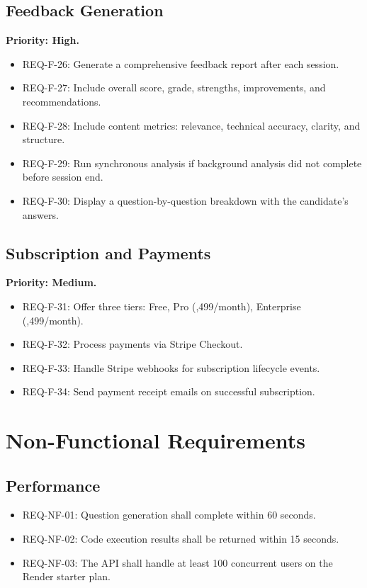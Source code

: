 \subsection{Feedback Generation}
\textbf{Priority: High.}
\begin{itemize}
  \item REQ-F-26: Generate a comprehensive feedback report after each session.
  \item REQ-F-27: Include overall score, grade, strengths, improvements, and recommendations.
  \item REQ-F-28: Include content metrics: relevance, technical accuracy, clarity, and structure.
  \item REQ-F-29: Run synchronous analysis if background analysis did not complete before session end.
  \item REQ-F-30: Display a question-by-question breakdown with the candidate's answers.
\end{itemize}

\subsection{Subscription and Payments}
\textbf{Priority: Medium.}
\begin{itemize}
  \item REQ-F-31: Offer three tiers: Free, Pro (,499/month), Enterprise (,499/month).
  \item REQ-F-32: Process payments via Stripe Checkout.
  \item REQ-F-33: Handle Stripe webhooks for subscription lifecycle events.
  \item REQ-F-34: Send payment receipt emails on successful subscription.
\end{itemize}

\section{Non-Functional Requirements}

\subsection*{Performance}
\begin{itemize}
  \item REQ-NF-01: Question generation shall complete within 60 seconds.
  \item REQ-NF-02: Code execution results shall be returned within 15 seconds.
  \item REQ-NF-03: The API shall handle at least 100 concurrent users on the Render starter plan.
\end{itemize}

